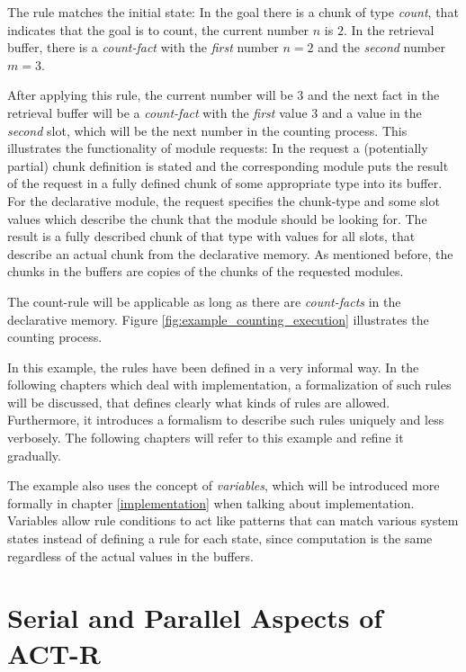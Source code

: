 The rule matches the initial state: In the goal there is a chunk of type \emph{count}, that indicates that the goal is to count, the current number $n$ is $2$. In the retrieval buffer, there is a \emph{count-fact} with the \emph{first} number $n = 2$ and the \emph{second} number $m = 3$. 

After applying this rule, the current number will be $3$ and the next fact in the retrieval buffer will be a \emph{count-fact} with the \emph{first} value $3$ and a value in the \emph{second} slot, which will be the next number in the counting process. This illustrates the functionality of module requests: In the request a (potentially partial) chunk definition is stated and the corresponding module puts the result of the request in a fully defined chunk of some appropriate type into its buffer. For the declarative module, the request specifies the chunk-type and some slot values which describe the chunk that the module should be looking for. The result is a fully described chunk of that type with values for all slots, that describe an actual chunk from the declarative memory. As mentioned before, the chunks in the buffers are copies of the chunks of the requested modules.

The count-rule will be applicable as long as there are \emph{count-facts} in the declarative memory. Figure \ref{fig:example_counting_execution} illustrates the counting process.

In this example, the rules have been defined in a very informal way. In the following chapters which deal with implementation, a formalization of such rules will be discussed, that defines clearly what kinds of rules are allowed. Furthermore, it introduces a formalism to describe such rules uniquely and less verbosely. The following chapters will refer to this example and refine it gradually.

The example also uses the concept of \emph{variables}, which will be introduced more formally in chapter \ref{implementation} when talking about implementation. Variables allow rule conditions to act like patterns that can match various system states instead of defining a rule for each state, since computation is the same regardless of the actual values in the buffers.

\section{Serial and Parallel Aspects of ACT-R}
\label{serial_parallel_aspects}

